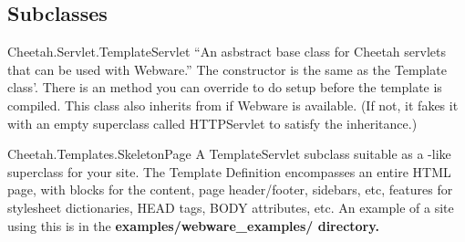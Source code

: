 \subsection{Subclasses}

\begin{description}

\item{Cheetah.Servlet.TemplateServlet}  ``An asbstract base class for Cheetah
     servlets that can be used with Webware.''  The constructor is the same
     as the Template class'.  There is an  method
     you can override to do setup before the template is compiled.  This class
     also inherits from  if Webware is
     available.  (If not, it fakes it with an empty superclass called
     HTTPServlet to satisfy the inheritance.)

\item{Cheetah.Templates.SkeletonPage}  A TemplateServlet subclass suitable as
     a -like superclass for your site.  The Template 
     Definition encompasses an entire HTML page, with blocks for the content,
     page header/footer, sidebars, etc, features for stylesheet dictionaries,
     HEAD tags, BODY attributes, etc.  An example of a site using this is in
     the \bf{examples/webware\_examples/} directory.

\end{description}

